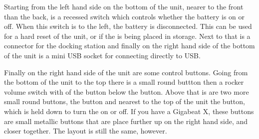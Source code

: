 {{  Starting from the left hand side on the bottom of the unit, nearer to the front
  than the back, is a recessed switch which 
  controls whether the battery is on or off.  When this switch is to the left,
  the battery is disconnected.  This can be used for a hard reset of the unit,
  or if the \dap{} is being placed in storage.  Next to that is a connector for
  the docking station and finally on the right hand side of the bottom of the
  unit is a mini USB socket for connecting directly to USB.
  
  Finally on the right hand side of the unit are some control buttons.  Going from
  the bottom of the unit to the top there is a small round \ButtonA{} buttton then a
  rocker volume switch with of the \ButtonVolDown{} button below the \ButtonVolUp{}
  button.  Above that is are two more small round buttons, the \ButtonMenu{} 
  button and nearest to the top of the unit the \ButtonPower{} button, which is held
  down to turn the \dap{} on or off. If you have a Gigabeat X, these buttons are small
  metallic buttons that are place further up on the right hand side, and closer
  together. The layout is still the same, however.}
  }
